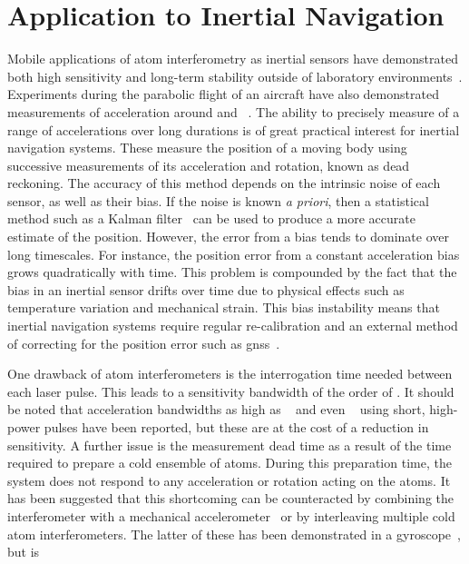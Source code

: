 \section{Application to Inertial Navigation}
Mobile applications of atom interferometry as inertial sensors have
demonstrated both high sensitivity and long-term stability outside of
laboratory environments~\cite{Barrett2013}. Experiments during the
parabolic flight of an aircraft have also demonstrated measurements of
acceleration around  and
~\cite{Nyman2006a,Geiger2011a}. 
The ability to precisely measure of a range of accelerations over long durations
is of great practical interest for inertial
navigation systems. These measure the position of a
moving body using successive measurements of its acceleration and
rotation, known as dead reckoning. The accuracy of this method depends
on the intrinsic noise of each sensor, as well as their bias. If the
noise is known \textit{a priori}, then a statistical method such as a
Kalman filter~\cite{Faruqi2000} can be used to produce a more accurate estimate of the
position. However, the error from a bias tends to dominate over long
timescales. For instance, the position
error from a constant acceleration bias grows quadratically with time.
This problem is compounded by the fact that the bias in an inertial
sensor drifts over time due to physical effects such as temperature
variation and mechanical strain. This bias instability means that
inertial navigation systems require regular re-calibration and an
external method of correcting for the position error such as
\ac{gnss}~\cite{Wen2016}. 
\par\noindent
One drawback of atom interferometers is the interrogation time needed
between each laser pulse. This leads to a sensitivity bandwidth of the order of
. It should be noted that acceleration bandwidths as
high as 
~\cite{Rakholia2014a} and even
~\cite{Biedermann2017} using short, high-power
pulses
have been reported, but these are at the cost of a reduction in sensitivity.
A further issue is the measurement dead time as a result of the time
required to prepare a cold ensemble of atoms. During this preparation time, the system
does not respond to any acceleration or rotation acting on the atoms.
It has been suggested that this shortcoming can be counteracted by
combining the interferometer with a mechanical accelerometer~\cite{JEKELI2005} or by
interleaving multiple cold atom interferometers. The latter of these
has been demonstrated in a gyroscope~\cite{Dutta2016}, but is
